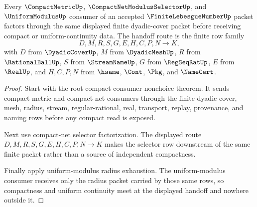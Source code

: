 \begin{theorem}
\label{thm:finite-lebesgue-number-compact-uniform-handoff-scope}
Every $\CompactMetricUp$, $\CompactNetModulusSelectorUp$, and $\UniformModulusUp$ consumer of an accepted $\FiniteLebesgueNumberUp$ packet factors through the same displayed finite dyadic-cover packet before receiving compact or uniform-continuity data. The handoff route is the finite row family
$$
D,M,R,S,G,E,H,C,P,N \to K,
$$
with $D$ from $\DyadicCoverUp$, $M$ from $\DyadicMeshUp$, $R$ from $\RationalBallUp$, $S$ from $\StreamNameUp$, $G$ from $\RegSeqRatUp$, $E$ from $\RealUp$, and $H,C,P,N$ from $\hsame$, $\Cont$, $\Pkg$, and $\NameCert$.
\end{theorem}
\begin{proof}
Start with the root compact consumer nonchoice theorem. It sends compact-metric and compact-net consumers through the finite dyadic cover, mesh, radius, stream, regular-rational, real, transport, replay, provenance, and naming rows before any compact read is exposed.

Next use compact-net selector factorization. The displayed route $D,M,R,S,G,E,H,C,P,N \to K$ makes the selector row downstream of the same finite packet rather than a source of independent compactness.

Finally apply uniform-modulus radius exhaustion. The uniform-modulus consumer receives only the radius packet carried by those same rows, so compactness and uniform continuity meet at the displayed handoff and nowhere outside it.
\end{proof}

